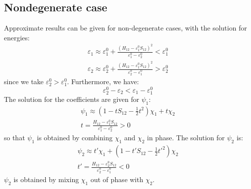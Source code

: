 \documentclass{article}
\begin{document}
\subsection{Nondegenerate case}
Approximate results can be given for non-degenerate cases, with the solution for energies:
\begin{align}
    \varepsilon_1 \approx \varepsilon_1^0 + \frac{(H_{12} - \varepsilon_1^0 S_{12})^2}{\varepsilon_1^0 - \varepsilon_2^0} < \varepsilon_1^0 \\
    \varepsilon_2 \approx \varepsilon_2^0 + \frac{(H_{12} - \varepsilon_1^0 S_{12})^2}{\varepsilon_2^0 - \varepsilon_1^0} > \varepsilon_2^0
\end{align}
since we take $\varepsilon_2^0 > \varepsilon_1^0$. Furthermore, we have:
\begin{equation}
    \varepsilon_2^0 - \varepsilon_2 < \varepsilon_1 - \varepsilon_1^0
\end{equation}
The solution for the coefficients are given for $\psi_1$:
\begin{gather}
    \psi_1 \approx \left(1 - tS_{12} - \frac{1}{2}t^2\right) \chi_1 + t \chi_2 \\
    t = \frac{H_{12}-\varepsilon_1^0S_{12}}{\varepsilon_1^0 - \varepsilon_2^0} > 0
\end{gather}
so that $\psi_1$ is obtained by combining $\chi_1$ and $\chi_2$ in phase. 
The solution for $\psi_2$ is:
\begin{gather}
    \psi_2 \approx t' \chi_1 + \left( 1 - t' S_{12} - \frac{1}{2}t'^2 \right) \chi_2 \\
    t' = \frac{H_{12}-\varepsilon_2^0S_{12}}{\varepsilon_2^0 - \varepsilon_1^0} < 0
\end{gather}
$\psi_2$ is obtained by mixing $\chi_1$ out of phase with $\chi_2$.
\end{document}
